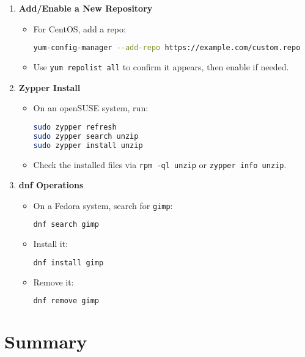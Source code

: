 \documentclass[a4paper]{report}
\begin{document}
\begin{enumerate}
    \item \textbf{Add/Enable a New Repository}
    \begin{itemize}
        \item For CentOS, add a repo:
        \begin{lstlisting}[language=bash]
yum-config-manager --add-repo https://example.com/custom.repo
        \end{lstlisting}
        \item Use \texttt{yum repolist all} to confirm it appears, then enable if needed.
    \end{itemize}

    \item \textbf{Zypper Install}
    \begin{itemize}
        \item On an openSUSE system, run:
        \begin{lstlisting}[language=bash]
sudo zypper refresh
sudo zypper search unzip
sudo zypper install unzip
        \end{lstlisting}
        \item Check the installed files via \texttt{rpm -ql unzip} or \texttt{zypper info unzip}.
    \end{itemize}

    \item \textbf{dnf Operations}
    \begin{itemize}
        \item On a Fedora system, search for \texttt{gimp}:
        \begin{lstlisting}[language=bash]
dnf search gimp
        \end{lstlisting}
        \item Install it:
        \begin{lstlisting}[language=bash]
dnf install gimp
        \end{lstlisting}
        \item Remove it:
        \begin{lstlisting}[language=bash]
dnf remove gimp
        \end{lstlisting}
    \end{itemize}
\end{enumerate}

\section*{Summary}
\end{document}
